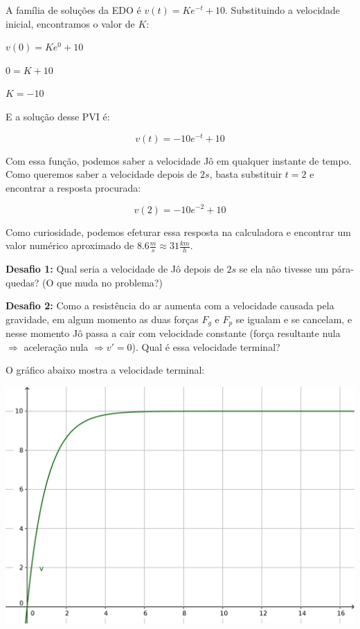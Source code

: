 \documentclass[a4paper]{article}
\begin{document}
A família de soluções da EDO é $v(t)=K e^{-t}+10$. Substituindo a
velocidade inicial, encontramos o valor de $K$:

$v(0) = K e^0 +10$

$0 = K+10$

$K=-10$

E a solução desse PVI é:

\begin{displaymath}
  v(t) = -10e^{-t}+10
\end{displaymath}

Com essa função, podemos saber a velocidade Jô em qualquer instante de
tempo. Como queremos saber a velocidade depois de $2s$, basta
substituir $t=2$ e encontrar a resposta procurada:

\begin{displaymath}
  v(2)=-10 e^{-2}+10
\end{displaymath}

Como curiosidade, podemos efeturar essa resposta na calculadora e
encontrar um valor numérico aproximado de
$8.6\frac{m}{s} \approx 31\frac{km}{h}$.

\hrulefill

{\bf Desafio 1:} Qual seria a velocidade de Jô depois de $2s$ se ela
não tivesse um pára-quedas? (O que muda no problema?)

\hrulefill

{\bf Desafio 2:} Como a resistência do ar aumenta com a velocidade
causada pela gravidade, em algum momento as duas forças $F_g$ e $F_p$
se igualam e se cancelam, e nesse momento Jô passa a cair com
velocidade constante (força resultante nula $\Rightarrow$ aceleração
nula $\Rightarrow v'=0$). Qual é essa velocidade terminal?

O gráfico abaixo mostra a velocidade terminal:

\begin{center}
  \includegraphics[width=.9\textwidth]{pqd}
\end{center}
\end{document}
